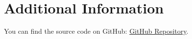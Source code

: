 \section{Additional Information}\label{app:app01}
You can find the source code on GitHub:  
\href{https://reurl.cc/KdeNa9}{GitHub Repository}.